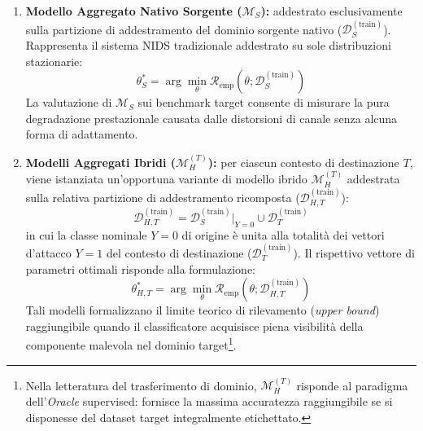 \begin{enumerate}
    \item \textbf{Modello Aggregato Nativo Sorgente ($\mathcal{M}_{S}$):}
    addestrato esclusivamente sulla partizione di addestramento del dominio sorgente nativo ($\mathcal{D}_{S}^{(\text{train})}$). Rappresenta il sistema NIDS tradizionale addestrato su sole distribuzioni stazionarie:
    \begin{equation}
        \theta_{S}^* = \arg\min_\theta \mathcal{R}_{\text{emp}}\left(\theta; \mathcal{D}_{S}^{(\text{train})}\right)
        \label{eq:ms_optimization}
    \end{equation}
    La valutazione di $\mathcal{M}_{S}$ sui benchmark target consente di misurare la pura degradazione prestazionale causata dalle distorsioni di canale senza alcuna forma di adattamento.
    \item \textbf{Modelli Aggregati Ibridi ($\mathcal{M}_{H}^{(T)}$):}
    per ciascun contesto di destinazione $T$, viene istanziata un'opportuna variante di modello ibrido $\mathcal{M}_{H}^{(T)}$ addestrata sulla relativa partizione di addestramento ricomposta ($\mathcal{D}_{H, T}^{(\text{train})}$):
    \begin{equation}
        \mathcal{D}_{H, T}^{(\text{train})} = \mathcal{D}_{S}^{(\text{train})}\Big|_{Y=0} \cup \mathcal{D}_{T}^{(\text{train})}
        \label{eq:dh_composition}
    \end{equation}
in cui la classe nominale $Y=0$ di origine è unita alla totalità dei vettori d'attacco $Y=1$ del contesto di destinazione ($\mathcal{D}_{T}^{(\text{train})}$). Il rispettivo vettore di parametri ottimali risponde alla formulazione:
    \begin{equation}
        \theta_{H, T}^* = \arg\min_\theta \mathcal{R}_{\text{emp}}\left(\theta; \mathcal{D}_{H, T}^{(\text{train})}\right)
        \label{eq:mh_optimization}
    \end{equation}
    Tali modelli formalizzano il limite teorico di rilevamento (\textit{upper bound}) raggiungibile quando il classificatore acquisisce piena visibilità della componente malevola nel dominio target\footnote{Nella letteratura del trasferimento di dominio, $\mathcal{M}_{H}^{(T)}$ risponde al paradigma dell'\textit{Oracle} supervised: fornisce la massima accuratezza raggiungibile se si disponesse del dataset target integralmente etichettato.}.
\end{enumerate}

